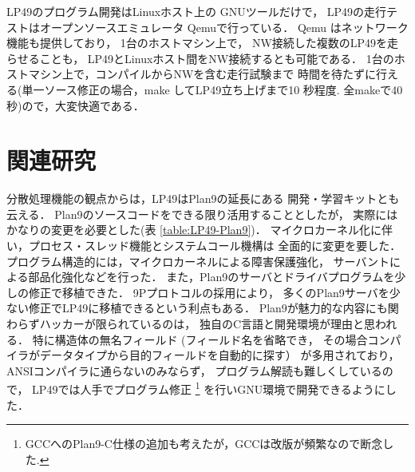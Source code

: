 \documentclass{ieicej}
\begin{document}
LP49のプログラム開発はLinuxホスト上の GNUツールだけで，
LP49の走行テストはオープンソースエミュレータ Qemu\cite{qemu}で行っている．
Qemu はネットワーク機能も提供しており，
1台のホストマシン上で，
NW接続した複数のLP49を走らせることも，
LP49とLinuxホスト間をNW接続するとも可能である．
1台のホストマシン上で，コンパイルからNWを含む走行試験まで
時間を待たずに行える(単一ソース修正の場合，make してLP49立ち上げまで10
秒程度. 全makeで40秒)ので，大変快適である．

\section{関連研究}


分散処理機能の観点からは，LP49はPlan9\cite{plan9,plan9HP}の延長にある
開発・学習キットとも云える．
Plan9のソースコードをできる限り活用することとしたが，
実際にはかなりの変更を必要とした(表 \ref{table:LP49-Plan9})．
マイクロカーネル化に伴い，プロセス・スレッド機能とシステムコール機構は
全面的に変更を要した．
プログラム構造的には，マイクロカーネルによる障害保護強化，
サーバントによる部品化強化などを行った．
また，Plan9のサーバとドライバプログラムを少しの修正で移植できた．
9Pプロトコルの採用により，
多くのPlan9サーバを少ない修正でLP49に移植できるという利点もある．
%
Plan9が魅力的な内容にも関わらずハッカーが限られているのは，
独自のC言語と開発環境が理由と思われる．
特に構造体の無名フィールド (フィールド名を省略でき，
その場合コンパイラがデータタイプから目的フィールドを自動的に探す）
が多用されており，ANSIコンパイラに通らないのみならず，
プログラム解読も難しくしているので，
LP49では人手でプログラム修正
\footnote{GCCへのPlan9-C仕様の追加も考えたが，GCCは改版が頻繁なので断念した.}
を行いGNU環境で開発できるようにした．
\end{document}

